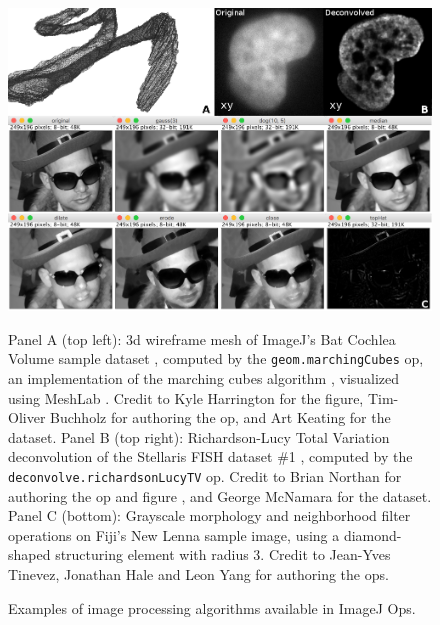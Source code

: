 \documentclass{bmcart}
\begin{document}
  \begin{figure}[h]
    \caption{Examples of image processing algorithms available in ImageJ Ops.}
    \includegraphics[width=4.75in,natwidth=997,natheight=713]{figure-1/figure-config1-label.png}
    \begin{flushleft}
      \footnotesize
      Panel A (top left): \acrshort{3d} wireframe mesh of ImageJ's Bat Cochlea
      Volume sample dataset \cite{bat_cochlea_volume}, computed by the
      \texttt{geom.marchingCubes} op, an implementation of the marching cubes
      algorithm \cite{marching_cubes}, visualized using MeshLab \cite{meshlab}.
      Credit to Kyle Harrington for the figure, Tim-Oliver Buchholz for
      authoring the op, and Art Keating for the dataset. Panel B (top right):
      Richardson-Lucy Total Variation deconvolution \cite{richardson_lucy} of
      the Stellaris FISH dataset \#1 \cite{stellaris_fish}, computed by the
      \texttt{deconvolve.richardsonLucyTV} op. Credit to Brian Northan for
      authoring the op and figure \cite{bnorthan_ops_decon}, and George
      McNamara for the dataset. Panel C (bottom): Grayscale morphology and
      neighborhood filter operations on Fiji's New Lenna sample image, using a
      diamond-shaped structuring element with radius 3. Credit to Jean-Yves
      Tinevez, Jonathan Hale and Leon Yang for authoring the ops.
    \end{flushleft}
  \end{figure}
\end{document}

